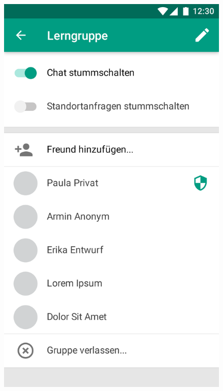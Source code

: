 \documentclass[aspectratio=1610]{beamer}
\begin{document}
\begin{frame}[plain]
{\begin{minipage}{0.5\textwidth}
\begin{figure}
                    \includegraphics[height = \paperheight - 50pt]{images/gui-mockups/group_members.png}%
                \end{figure}%
            \end{minipage}%
        }
  \end{frame}
\end{document}
